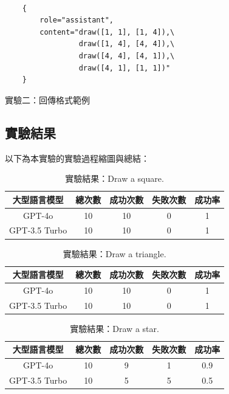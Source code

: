 \documentclass[class=NCU_thesis, crop=false]{standalone}
\begin{document}
\begin{listing}[h]
    \begin{verbatim}

    {
        role="assistant",
        content="draw([1, 1], [1, 4]),\
                 draw([1, 4], [4, 4]),\
                 draw([4, 4], [4, 1]),\
                 draw([4, 1], [1, 1])"
    }

    \end{verbatim}
\caption{實驗二：回傳格式範例} 
\end{listing}

\clearpage
\subsection{實驗結果}

以下為本實驗的實驗過程縮圖與總結：\\

\begin{table}[h]
    \centering
    \caption{實驗結果：Draw a square.}
    \begin{tabular}{ccccc}
    \hline
    大型語言模型 & 總次數 & 成功次數 & 失敗次數 & 成功率 \\
    \hline
    GPT-4o & 10 & 10 & 0 & 1\\
    \hline
    GPT-3.5 Turbo & 10 & 10 & 0 & 1\\
    \hline
    \end{tabular}
\end{table}

\begin{table}[h]
    \centering
    \caption{實驗結果：Draw a triangle.}
    \begin{tabular}{ccccc}
    \hline
    大型語言模型 & 總次數 & 成功次數 & 失敗次數 & 成功率 \\
    \hline
    GPT-4o & 10 & 10 & 0 & 1\\
    \hline
    GPT-3.5 Turbo & 10 & 10 & 0 & 1\\
    \hline
    \end{tabular}
\end{table}

\begin{table}[h]
    \centering
    \caption{實驗結果：Draw a star.}
    \begin{tabular}{ccccc}
    \hline
    大型語言模型 & 總次數 & 成功次數 & 失敗次數 & 成功率 \\
    \hline
    GPT-4o & 10 & 9 & 1 & 0.9\\
    \hline
    GPT-3.5 Turbo & 10 & 5 & 5 & 0.5\\
    \hline
    \end{tabular}
\end{table}
\end{document}
